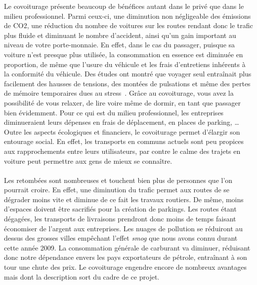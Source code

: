 \documentclass[12pt, a4paper, oneside]{article}
\begin{document}
    \indent Le covoiturage présente beaucoup de bénéfices autant dans le privé que dans le milieu professionnel. Parmi ceux-ci, une diminution non négligeable des émissions de CO2, une réduction du nombre de voitures sur les routes rendant donc le trafic plus fluide et diminuant le nombre d'accident, ainsi qu'un gain important au niveau de votre porte-monnaie. En effet, dans le cas du passager, puisque sa voiture n'est presque plus utilisée, la consommation en essence est diminuée en proportion, de même que l'usure du véhicule et les frais d'entretiens inhérents à la conformité du véhicule. Des études ont montré que voyager seul entraînait plus facilement des hausses de tensions, des montées de pulsations et même des pertes de mémoire temporaires dues au stress~\cite{health-study}. Grâce au covoiturage, vous avez la possibilité de vous relaxer, de lire voire même de dormir, en tant que passager bien évidemment. Pour ce qui est du milieu professionnel, les entreprises diminueraient leurs dépenses en frais de déplacement, en places de parking, \dots Outre les aspects écologiques et financiers, le covoiturage permet d'élargir son entourage social. En effet, les transports en communs actuels sont peu propices aux rapprochements entre leurs utilisateurs, par contre le calme des trajets en voiture peut permettre aux gens de mieux se connaître.\\\\
    \indent Les retombées sont nombreuses et touchent bien plus de personnes que l'on pourrait croire. En effet, une diminution du trafic permet aux routes de se dégrader moins vite et diminue de ce fait les travaux routiers. De même, moins d'espaces doivent être sacrifiés pour la création de parkings. Les routes étant dégagées, les transports de livraisons prendront donc moins de temps faisant économiser de l'argent aux entreprises. Les nuages de pollution se réduiront au dessus des grosses villes empêchant l'effet \textit{smog} que nous avons connu durant cette année 2009. La consommation générale de carburant va diminuer, réduisant donc notre dépendance envers les pays exportateurs de pétrole, entraînant à son tour une chute des prix. Le covoiturage engendre encore de nombreux avantages mais dont la description sort du cadre de ce projet.\\\\
\end{document}
